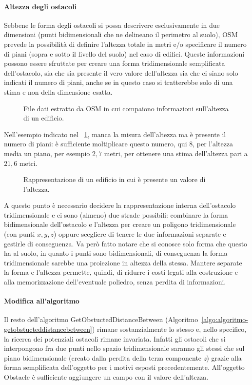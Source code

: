 \paragraph{Altezza degli ostacoli}%
Sebbene le forma degli ostacoli si possa descrivere esclusivamente in due dimensioni (punti bidimensionali che ne delineano il perimetro al suolo),
OSM prevede la possibilità di definire l'altezza totale in metri e/o specificare il numero di piani (sopra e sotto il livello del suolo)
nel caso di edifici.
Queste informazioni possono essere sfruttate per creare una forma tridimensionale semplificata dell'ostacolo,
sia che sia presente il vero valore dell'altezza sia che ci siano solo indicati il numero di piani,
anche se in questo caso si tratterebbe solo di una stima e non della dimensione esatta.
%
\begin{figure}[htbp]
	\centering
\caption{File dati estratto da OSM in cui compaiono informazioni sull'altezza di un edificio.\label{fig:esempio-pd-osm-edificio-altezza}}
\end{figure}
%
Nell'esempio indicato nel \figurename~\ref{fig:esempio-pd-osm-edificio-altezza}, manca la misura dell'altezza ma è presente
il numero di piani: è sufficiente moltiplicare questo numero, qui $8$, per l'altezza media un piano, per esempio $2,7$ metri,
per ottenere una stima dell'altezza pari a $21,6$ metri.
%
\begin{figure}[htbp]
	\centering
\caption{Rappresentazione di un edificio in cui è presente un valore di l'altezza.\label{fig:esempio-pd-poly-edificio-altezza}}
\end{figure}
%
A questo punto è necessario decidere la rappresentazione interna dell'ostacolo tridimensionale
e ci sono (almeno) due strade possibili: combinare la forma bidimensionale dell'ostacolo
e l'altezza per creare un poligono tridimensionale (con punti $x,y,z$) oppure
scegliere di tenere le due informazioni separate e gestirle di conseguenza.
Va però fatto notare che si conosce solo forma che questo ha al suolo,
in quanto i punti sono bidimensionali, di conseguenza la forma tridimensionale
sarebbe una proiezione in altezza della stessa.
Mantere separate la forma e l'altezza permette, quindi, di ridurre i costi legati
alla costruzione e alla memorizzazione dell'eventuale poliedro,
senza perdita di informazioni.
%
\paragraph{Modifica all'algoritmo}%
Il resto dell'algoritmo \textsf{GetObstuctedDistanceBetween} (Algoritmo~\ref{algo:algoritmo-getobstucteddistancebetween})
rimane sostanzialmente lo stesso e, nello specifico, la ricerca dei potenziali ostacoli rimane invariata.
Infatti gli ostacoli che si interpongono fra due punti nello spazio tridimensionale saranno gli stessi che sul piano bidimensionale
(creato dalla perdita della terza componente \textit{z})
grazie alla forma semplificata dell'oggetto per i motivi esposti precedentemente.
All'oggetto \textsf{Obstacle} è sufficiente aggiungere un campo con il valore dell'altezza.


